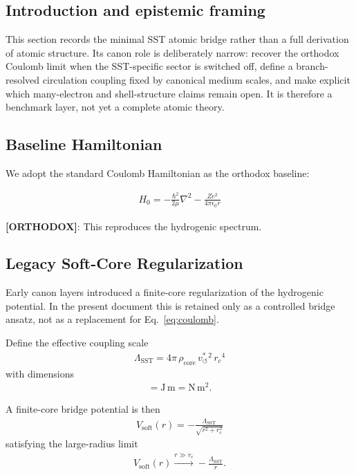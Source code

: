 \documentclass[11pt]{article}
\theoremstyle{definition}
\theoremstyle{plain}
\theoremstyle{remark}
\newcommand{\rhocore}{\rho_{\mathrm{core}}}
\newcommand{\rc}{{r_c}}
\newcommand{\vchar}{v_{\!\boldsymbol{\circlearrowleft}}^{\ast}}
\begin{document}
    \subsection{Introduction and epistemic framing}
        This section records the minimal SST atomic bridge rather than a full derivation of atomic structure. Its canon role is deliberately narrow: recover the orthodox Coulomb limit when the SST-specific sector is switched off, define a branch-resolved circulation coupling fixed by canonical medium scales, and make explicit which many-electron and shell-structure claims remain open. It is therefore a benchmark layer, not yet a complete atomic theory.
    
    \subsection{Baseline Hamiltonian}
        
        We adopt the standard Coulomb Hamiltonian as the orthodox baseline:
        
        \begin{align}
            H_0 = -\frac{\hbar^2}{2\mu} \nabla^2 - \frac{Ze^2}{4\pi \epsilon_0 r}
            \label{eq:coulomb}
        \end{align}
        
        \textbf{[ORTHODOX]}: This reproduces the hydrogenic spectrum.

    \subsection{Legacy Soft-Core Regularization}

        Early canon layers introduced a finite-core regularization of the hydrogenic potential. In the present document this is retained only as a controlled bridge ansatz, not as a replacement for Eq.~\eqref{eq:coulomb}.

        Define the effective coupling scale
        \begin{align}
            \Lambda_{\mathrm{SST}} = 4\pi \, \rhocore \, \vchar^{2} \, \rc^{4}
            \label{eq:lambda_sst}
        \end{align}
        with dimensions
        \begin{align}
            [\Lambda_{\mathrm{SST}}] = \mathrm{J\,m} = \mathrm{N\,m^2}.
        \end{align}

        A finite-core bridge potential is then
        \begin{align}
            V_{\mathrm{soft}}(r) = -\frac{\Lambda_{\mathrm{SST}}}{\sqrt{r^2+r_c^2}}
            \label{eq:softcore_potential}
        \end{align}
        satisfying the large-radius limit
        \begin{align}
            V_{\mathrm{soft}}(r) \xrightarrow{r\gg r_c} -\frac{\Lambda_{\mathrm{SST}}}{r}.
        \end{align}
\end{document}

